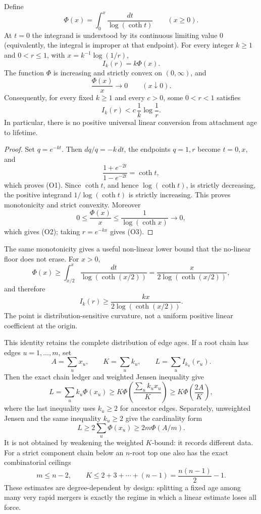 \begin{theorem}
\label{res:orlicz-currency}
Define
\[
 \Phi(x)=\int_0^x\frac{dt}{\log(\coth t)}\qquad(x\ge0).
\]
At $t=0$ the integrand is understood by its continuous limiting value $0$
(equivalently, the integral is improper at that endpoint).
For every integer $k\ge1$ and $0<r\le1$, with
$x=k^{-1}\log(1/r)$,
\[
 I_k(r)=k\Phi(x).                                      \tag{O1}
\]
The function $\Phi$ is increasing and strictly convex on $(0,\infty)$, and
\[
 \frac{\Phi(x)}x\longrightarrow0\qquad(x\downarrow0). \tag{O2}
\]
Consequently, for every fixed $k\ge1$ and every $c>0$, some $0<r<1$
satisfies
\[
 I_k(r)<c\,\frac1k\log\frac1r.                        \tag{O3}
\]
In particular, there is no positive universal linear conversion from
attachment age to lifetime.
\end{theorem}

\begin{proof}
Set $q=e^{-kt}$.  Then $dq/q=-k\,dt$, the endpoints $q=1,r$ become
$t=0,x$, and
\[
 \frac{1+e^{-2t}}{1-e^{-2t}}=\coth t,
\]
which proves (O1).  Since $\coth t$, and hence $\log(\coth t)$, is strictly
decreasing, the positive integrand $1/\log(\coth t)$ is strictly increasing.
This proves monotonicity and strict convexity.  Moreover
\[
 0\le\frac{\Phi(x)}x\le\frac1{\log(\coth x)}\longrightarrow0,
\]
which gives (O2); taking $r=e^{-kx}$ gives (O3).
\end{proof}

The same monotonicity gives a useful non-linear lower bound that the no-linear
floor does not erase.  For $x>0$,
\[
 \Phi(x)\ge\int_{x/2}^x\frac{dt}{\log(\coth(x/2))}
 =\frac{x}{2\log(\coth(x/2))},
\]
and therefore
\[
 I_k(r)\ge
 \frac{kx}{2\log(\coth(x/2))}.                       \tag{O3$'$}
\]
The point is distribution-sensitive curvature, not a uniform positive linear
coefficient at the origin.

This identity retains the complete distribution of edge ages.  If a root
chain has edges $u=1,\ldots,m$, set
\[
 A=\sum_u x_u,\qquad K=\sum_u k_u,\qquad
 L=\sum_u I_{k_u}(r_u).
\]
Then the exact chain ledger and weighted Jensen inequality give
\[
L=\sum_u k_u\Phi(x_u)
 \ge K\Phi\!\left(\frac{\sum_u k_ux_u}{K}\right)
 \ge K\Phi\!\left(\frac{2A}{K}\right),                \tag{O4}
\]
where the last inequality uses $k_u\ge2$ for ancestor edges.  Separately,
unweighted Jensen and the same inequality $k_u\ge2$ give the
cardinality form
\[
 L\ge2\sum_u\Phi(x_u)\ge2m\Phi(A/m).                  \tag{O4$'$}
\]
It is not obtained by weakening the weighted $K$-bound: it records different
data.  For a strict component chain below an $n$-root top one also has the
exact combinatorial ceilings
\[
 m\le n-2,
 \qquad
 K\le2+3+\cdots+(n-1)=\frac{n(n-1)}2-1.
\]
These estimates are
degree-dependent by design: splitting a fixed age among many very rapid
mergers is exactly the regime in which a linear estimate loses all force.

